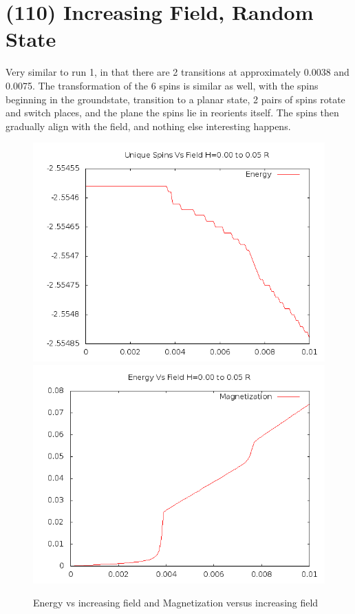 \documentclass{article}
\begin{document}
\section{(110) Increasing Field, Random State}
Very similar to run 1, in that there are 2 transitions at approximately 0.0038 and 0.0075. The transformation of the 
6 spins is similar as well,
with the spins beginning in the groundstate, transition to a planar state, 2 pairs of spins rotate and switch places,
and the plane the spins lie in reorients itself. The spins then gradually align with the field, and nothing
else interesting happens. 
\begin{figure}[ht]
 \centering 
\includegraphics[scale=0.3]{110/E000to005R.png}
\includegraphics[scale=0.3]{110/M000to005R.png}
\caption{Energy vs increasing field and Magnetization versus increasing field}
\end{figure}
\end{document}
